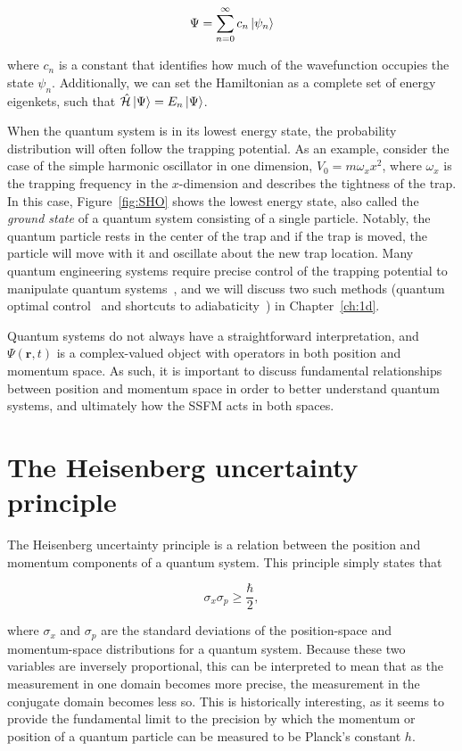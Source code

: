 \begin{equation}
\Psi = \sum_{n=0}^{\infty}c_n\ket{\psi_n}
\end{equation}

\noindent where $c_n$ is a constant that identifies how much of the wavefunction occupies the state $\psi_n$.
Additionally, we can set the Hamiltonian as a complete set of energy eigenkets, such that $\mathcal{\hat H}\ket{\Psi} = E_n\ket{\Psi}$.

When the quantum system is in its lowest energy state, the probability distribution will often follow the trapping potential.
As an example, consider the case of the simple harmonic oscillator in one dimension, $V_0 = m \omega_x x^2$, where $\omega_x$ is the trapping frequency in the $x$-dimension and describes the tightness of the trap.
In this case, Figure~\ref{fig:SHO} shows the lowest energy state, also called the \textit{ground state} of a quantum system consisting of a single particle.
Notably, the quantum particle rests in the center of the trap and if the trap is moved, the particle will move with it and oscillate about the new trap location.
Many quantum engineering systems require precise control of the trapping potential to manipulate quantum systems~\cite{menchon2016}, and we will discuss two such methods (quantum optimal control~\cite{werschnik2007} and shortcuts to adiabaticity~\cite{guery2019}) in Chapter~\ref{ch:1d}.


Quantum systems do not always have a straightforward interpretation, and $\Psi(\mathbf{r},t)$ is a complex-valued object with operators in both position and momentum space.
As such, it is important to discuss fundamental relationships between position and momentum space in order to better understand quantum systems, and ultimately how the SSFM acts in both spaces.

\section{The Heisenberg uncertainty principle}


The Heisenberg uncertainty principle is a relation between the position and momentum components of a quantum system.
This principle simply states that

$$
\sigma_x \sigma_p \geq \frac{\hbar}{2},
$$

\noindent where $\sigma_x$ and $\sigma_p$ are the standard deviations of the position-space and momentum-space distributions for a quantum system.
Because these two variables are inversely proportional, this can be interpreted to mean that as the measurement in one domain becomes more precise, the measurement in the conjugate domain becomes less so.
This is historically interesting, as it seems to provide the fundamental limit to the precision by which the momentum or position of a quantum particle can be measured to be Planck's constant $h$.

